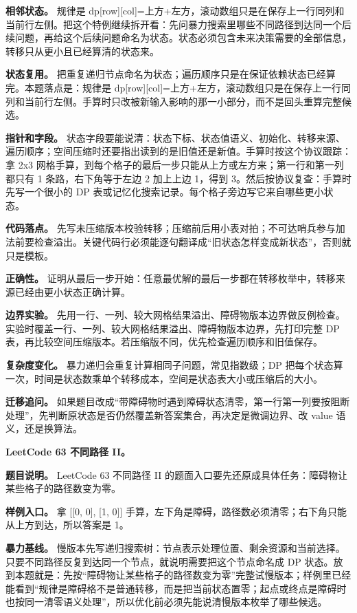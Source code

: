 \textbf{相邻状态。} 规律是 dp[row][col]=上方+左方，滚动数组只是在保存上一行同列和当前行左侧。把这个特例继续拆开看：先问暴力搜索里哪些不同路径到达同一个后续问题，再给这个后续问题命名为状态。状态必须包含未来决策需要的全部信息，转移只从更小且已经算清的状态来。

\textbf{状态复用。} 把重复递归节点命名为状态；遍历顺序只是在保证依赖状态已经算完。本题落点是：规律是 dp[row][col]=上方+左方，滚动数组只是在保存上一行同列和当前行左侧。手算时只改被新输入影响的那一小部分，而不是回头重算完整候选。

\textbf{指针和字段。} 状态字段要能说清：状态下标、状态值语义、初始化、转移来源、遍历顺序；空间压缩时还要指出读到的是旧值还是新值。手算时按这个协议跟踪：拿 2x3 网格手算，到每个格子的最后一步只能从上方或左方来；第一行和第一列都只有 1 条路，右下角等于左边 2 加上上边 1，得到 3。然后按协议复查：手算时先写一个很小的 DP 表或记忆化搜索记录。每个格子旁边写它来自哪些更小状态。

\textbf{代码落点。} 先写未压缩版本校验转移；压缩前后用小表对拍；不可达哨兵参与加法前要检查溢出。关键代码行必须能逐句翻译成“旧状态怎样变成新状态”，否则就只是模板。

\textbf{正确性。} 证明从最后一步开始：任意最优解的最后一步都在转移枚举中，转移来源已经由更小状态正确计算。

\textbf{边界实验。} 先用一行、一列、较大网格结果溢出、障碍物版本边界做反例检查。实验时覆盖一行、一列、较大网格结果溢出、障碍物版本边界，先打印完整 DP 表，再比较空间压缩版本。若压缩版不同，优先检查遍历顺序和旧值保存。

\textbf{复杂度变化。} 暴力递归会重复计算相同子问题，常见指数级；DP 把每个状态算一次，时间是状态数乘单个转移成本，空间是状态表大小或压缩后的大小。

\textbf{迁移追问。} 如果题目改成“带障碍物时遇到障碍状态清零，第一行第一列要按阻断处理”，先判断原状态是否仍然覆盖新答案集合，再决定是微调边界、改 value 语义，还是换算法。

\noindent\textbf{LeetCode 63 不同路径 II。}

\textbf{题目说明。} LeetCode 63 不同路径 II 的题面入口要先还原成具体任务：障碍物让某些格子的路径数变为零。

\textbf{样例入口。} 拿 [[0, 0], [1, 0]] 手算，左下角是障碍，路径数必须清零；右下角只能从上方到达，所以答案是 1。

\textbf{暴力基线。} 慢版本先写递归搜索树：节点表示处理位置、剩余资源和当前选择。只要不同路径反复到达同一个节点，就说明需要把这个节点命名成 DP 状态。放到本题就是：先按“障碍物让某些格子的路径数变为零”完整试慢版本；样例里已经能看到“规律是障碍格不是普通转移，而是把当前状态置零；起点或终点是障碍时也按同一清零语义处理”，所以优化前必须先能说清慢版本枚举了哪些候选。


